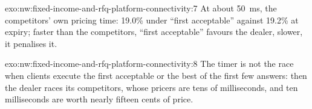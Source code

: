 \begin{solution}{exo:nw:fixed-income-and-rfq-platform-connectivity:7}
At about \qty{50}{\milli\second}, the competitors' own pricing time: 19.0\% under ``first acceptable'' against 19.2\% at expiry; faster
than the competitors, ``first acceptable'' favours the dealer, slower, it penalises it.
\end{solution}

\begin{solution}{exo:nw:fixed-income-and-rfq-platform-connectivity:8}
The timer is not the race when clients execute the first acceptable or the best of the first few answers: then the dealer races its
competitors, whose pricers are tens of milliseconds, and ten milliseconds are worth nearly fifteen cents of price.
\end{solution}

